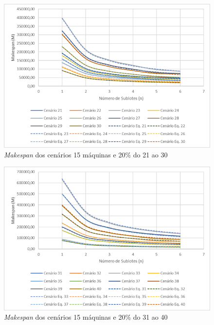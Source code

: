 \begin{figure}[H]
    \centering
     \includegraphics[width=13cm]{Apendices/Figuras/15m20_21-30.png}
     \caption{\textit{Makespan} dos cenários 15 máquinas e 20\% do 21 ao 30}
    \label{fig:15m20_21-30}
\end{figure}

\begin{figure}[H]
    \centering
     \includegraphics[width=13cm]{Apendices/Figuras/15m20_31-40.png}
     \caption{\textit{Makespan} dos cenários 15 máquinas e 20\% do 31 ao 40}
    \label{fig:15m20_31-40}
\end{figure}

